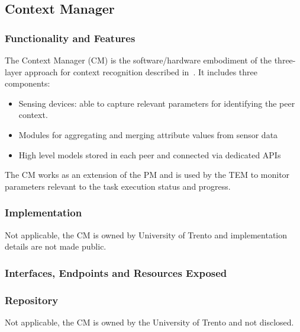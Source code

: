 \subsection{Context Manager}
\subsubsection{Functionality and Features}
The Context Manager (CM) is the software/hardware embodiment of the three-layer approach for context recognition described in~\cite{D4.3}. It includes three components:
\begin{itemize}
\item Sensing devices: able to capture relevant parameters for identifying the peer context.
\item Modules for aggregating and merging attribute values from sensor data 
\item High level models stored in each peer and connected via dedicated APIs
\end{itemize}
The CM works as an extension of the PM and is used by the TEM to monitor parameters relevant to the task execution status and progress.
\subsubsection{Implementation}
Not applicable, the CM is owned by University of Trento and implementation details are not made public.

\subsubsection{Interfaces, Endpoints and Resources Exposed}
\subsubsection{Repository}
Not applicable, the CM is owned by the University of Trento and not disclosed. 